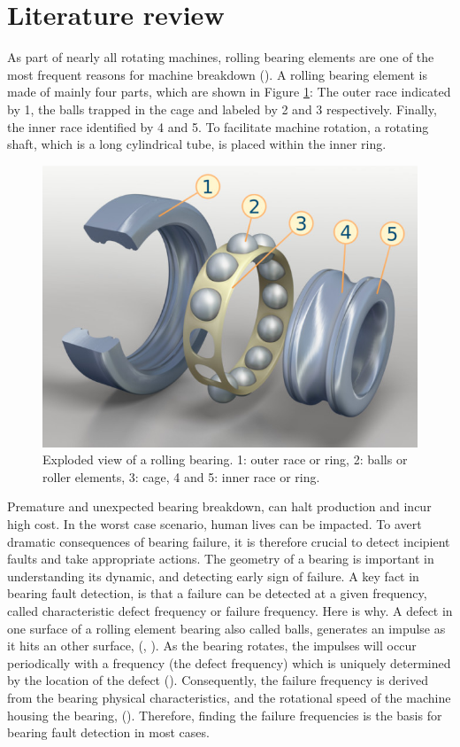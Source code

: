 \documentclass[../Main/thesis.tex]{subfiles}
\begin{document}
\clearpage
\section{Literature review}
\label{sec:relatedwork}
As part of nearly all rotating machines, rolling bearing elements are one of the most frequent reasons for machine breakdown (\cite{randal2010}). A rolling bearing element is made of mainly four parts, which are shown in Figure \ref{fig:bearing-s}: The outer race indicated by 1, the balls trapped in the cage and labeled by 2 and 3 respectively. Finally, the inner race identified by 4 and 5. To facilitate machine rotation, a rotating shaft, which is a long cylindrical tube, is placed within the inner ring.
\begin{figure}[H]
	\centering
	\includegraphics[width=0.5\linewidth]{../fig/bearing-s}
	\caption{Exploded view of a rolling bearing. 1: outer race or ring, 2: balls or roller elements, 3: cage, 4 and 5: inner race or ring.}
	\label{fig:bearing-s}
\end{figure}
\justify
Premature and unexpected bearing breakdown, can halt production and incur high cost. In the worst case scenario, human lives can be impacted. To avert dramatic consequences of bearing failure, it is therefore crucial to detect incipient faults and take appropriate actions.
\justify
The geometry of a bearing is important in understanding its dynamic, and detecting early sign of failure.
 A key fact in bearing fault detection, is that a failure can be detected at a given frequency, called characteristic defect frequency or failure frequency. Here is why. A defect in one surface of a rolling element bearing also called balls, generates an impulse as it hits an other surface, (\cite{mcfadden1984a}, \cite{mcfadden1984b}). As the bearing rotates, the impulses will occur periodically with a frequency (the defect frequency) which is uniquely determined by the location of the defect (\cite{mcfadden1984a}). Consequently, the failure frequency is derived from the bearing physical characteristics, and the rotational speed of the machine housing the bearing, (\cite{mcfadden1984a}). Therefore, finding the failure frequencies is the basis for bearing fault detection in most cases.
\end{document}
